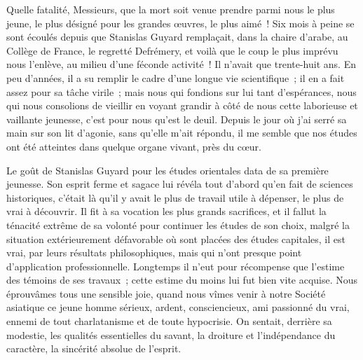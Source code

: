 \documentclass[french,twoside]{book} %
\newcommand\orgName[1]{#1}
\newcommand\persName[1]{#1}
\newcommand{\dateline}[1]{\medskip{\RaggedLeft{#1}\par}\bigskip}
\begin{document}
\dateline{9 septembre 1884}
\noindent Quelle fatalité, Messieurs, que la mort soit venue prendre parmi nous le plus jeune, le plus désigné pour les grandes œuvres, le plus aimé ! Six mois à peine se sont écoulés depuis que {\persName Stanislas Guyard} remplaçait, dans la chaire d’arabe, au {\orgName Collège de France}, le regretté {\persName Defrémery}, et voilà que le coup le plus imprévu nous l’enlève, au milieu d’une féconde activité ! Il n’avait que trente-huit ans. En peu d’années, il a su remplir le cadre d’une longue vie scientifique ; il en a fait assez pour sa tâche virile ; mais nous qui fondions sur lui tant d’espérances, nous qui nous consolions de vieillir en voyant grandir à côté de nous cette laborieuse et vaillante jeunesse, c’est pour nous qu’est le deuil. Depuis le jour où j’ai serré sa main sur son lit d’agonie, sans qu’elle m’ait répondu, il me semble que nos études ont été atteintes dans quelque organe vivant, près du cœur.\par
Le goût de {\persName Stanislas Guyard} pour les études orientales data de sa première jeunesse. Son esprit ferme et sagace lui révéla tout d’abord qu’en fait de sciences historiques, c’était là qu’il y avait le plus de travail utile à dépenser, le plus de vrai à découvrir. Il fit à sa vocation les plus grands sacrifices, et il fallut la ténacité extrême de sa volonté pour continuer les études de son choix, malgré la situation extérieurement défavorable où sont placées des études capitales, il est vrai, par leurs résultats philosophiques, mais qui n’ont presque point d’application professionnelle. Longtemps il n’eut pour récompense que l’estime des témoins de ses travaux ; cette estime du moins lui fut bien vite acquise. Nous éprouvâmes tous une sensible joie, quand nous vîmes venir à notre {\orgName Société asiatique} ce jeune homme sérieux, ardent, consciencieux, ami passionné du vrai, ennemi de tout charlatanisme et de toute hypocrisie. On sentait, derrière sa modestie, les qualités essentielles du savant, la droiture et l’indépendance du caractère, la sincérité absolue de l’esprit.\par
\end{document}
